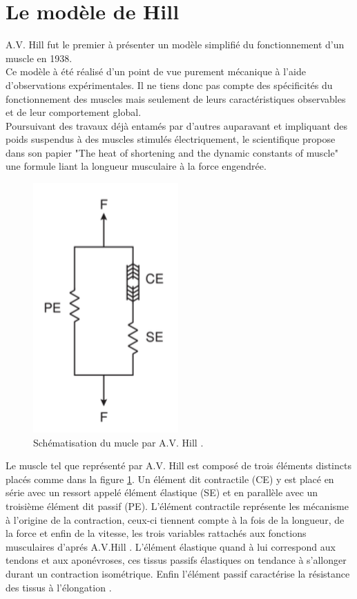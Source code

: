 \section{Le modèle de Hill}
A.V. Hill fut le premier à présenter un modèle simplifié du fonctionnement d'un muscle en 1938.\\
Ce modèle à été réalisé d'un point de vue purement mécanique à l'aide d'observations expérimentales. Il ne tiens donc pas compte des spécificités du fonctionnement des muscles mais seulement de leurs caractéristiques observables et de leur comportement global.\\

Poursuivant des travaux déjà entamés par d'autres auparavant et impliquant des poids suspendus à des muscles stimulés électriquement, le scientifique propose dans son papier "The heat of shortening and the dynamic constants of muscle" \cite{hill_archibald_vivian_heat_1938} une formule liant la longueur musculaire à la force engendrée.\\

\begin{figure}[ht]
    \centering\includegraphics[scale=0.4]{Images/Hill.png}
		\caption{Schématisation du mucle par A.V. Hill \cite{berranen_simulation_2015}.}
		\label{Hill}
\end{figure}
Le muscle tel que représenté par A.V. Hill est composé de trois éléments distincts placés comme dans la figure \ref{Hill}. Un élément dit contractile (CE) y est placé en série avec un ressort appelé élément élastique (SE) et en parallèle avec un troisième élément dit passif (PE). L'élément contractile représente les mécanisme à l'origine de la contraction, ceux-ci tiennent compte à la fois de la longueur, de la force et enfin de la vitesse, les trois variables rattachés aux fonctions musculaires d'aprés A.V.Hill \cite{linden_mechanical_1998}. L'élément élastique quand à lui correspond aux tendons et aux aponévroses, ces tissus passifs élastiques on tendance à s'allonger durant un contraction isométrique. Enfin l'élément passif caractérise la résistance des tissus à l'élongation \cite{berranen_simulation_2015}.

